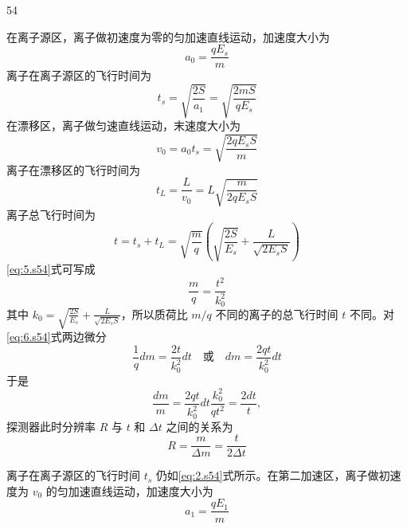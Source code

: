 \begin{solution}{54}
\begin{subsolution}
在离子源区，离子做初速度为零的匀加速直线运动，加速度大小为
\begin{equation}
a_{0} = \frac{qE_{s}}{m}
\label{eq:1.s54}
\end{equation}
离子在离子源区的飞行时间为
\begin{equation}
t_{s} = \sqrt{\frac{2S}{a_{1}}} = \sqrt{\frac{2mS}{qE_{s}}}
\label{eq:2.s54}
\end{equation}
在漂移区，离子做匀速直线运动，末速度大小为
\begin{equation}
v_{0} = a_{0}t_{s} = \sqrt{\frac{2qE_{s}S}{m}}
\label{eq:3.s54}
\end{equation}
离子在漂移区的飞行时间为
\begin{equation}
t_{L} = \frac{L}{v_{0}} = L\sqrt{\frac{m}{2qE_{s}S}}
\label{eq:4.s54}
\end{equation}
离子总飞行时间为
\begin{equation}
t = t_{s} + t_{L} = \sqrt{\frac{m}{q}}\left(\sqrt{\frac{2S}{E_{s}}} + \frac{L}{\sqrt{2E_{s}S}}\right)
\label{eq:5.s54}
\end{equation}
\eqref{eq:5.s54}式可写成
\begin{equation}
\frac{m}{q} = \frac{t^{2}}{k_{0}^{2}}
\label{eq:6.s54}
\end{equation}
其中 $k_{0} = \sqrt{\frac{2S}{E_{s}}} +\frac{L}{\sqrt{2E_{s}S}}$，所以质荷比 $m/q$ 不同的离子的总飞行时间 $t$ 不同。对\eqref{eq:6.s54}式两边微分
\begin{equation}
\frac{1}{q}dm = \frac{2t}{k_{0}^{2}}dt \quad \text{或} \quad dm = \frac{2qt}{k_{0}^{2}}dt
\label{eq:7.s54}
\end{equation}
于是
\begin{equation}
\frac{dm}{m} = \frac{2qt}{k_{0}^{2}}dt \frac{k_{0}^{2}}{qt^{2}} = \frac{2dt}{t},
\label{eq:8.s54}
\end{equation}
探测器此时分辨率 $R$ 与 $t$ 和 $\Delta t$ 之间的关系为
\begin{equation}
R = \frac{m}{\Delta m} = \frac{t}{2\Delta t}
\label{eq:9.s54}
\end{equation}
\end{subsolution}
\begin{subsolution}
离子在离子源区的飞行时间 $t_{s}$ 仍如\eqref{eq:2.s54}式所示。在第二加速区，离子做初速度为 $v_{0}$ 的匀加速直线运动，加速度大小为
\begin{equation}
a_{1} = \frac{qE_{1}}{m}
\label{eq:10.s54}
\end{equation}

\end{subsolution}
\end{solution}
